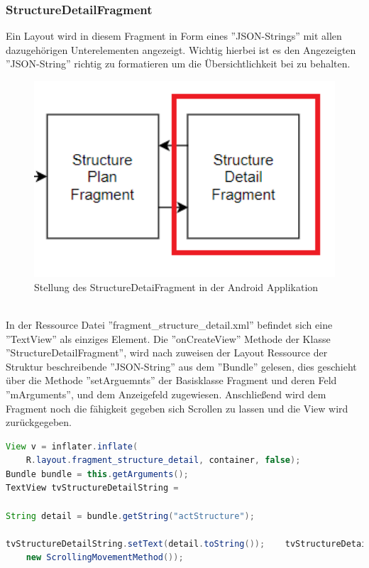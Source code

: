 \subsubsection{StructureDetailFragment}
Ein Layout wird in diesem Fragment in Form eines ''JSON-Strings'' mit allen dazugehörigen Unterelementen angezeigt. Wichtig hierbei ist es den Angezeigten ''JSON-String'' richtig zu formatieren um die Übersichtlichkeit bei zu behalten.
\\
\begin{figure}[H]
\centering
\includegraphics[width=1.0\textwidth]{images/06_AndroidApp/06_StructureDetailStellung}
\caption{Stellung des StructureDetaiFragment in der Android Applikation}
\label{fig:mediaNav}
\end{figure}
\\
In der Ressource Datei ''fragment\_structure\_detail.xml'' befindet sich eine ''TextView'' als einziges Element. Die ''onCreateView'' Methode der Klasse ''StructureDetailFragment'', wird nach zuweisen der Layout Ressource der Struktur beschreibende ''JSON-String'' aus dem ''Bundle'' gelesen, dies geschieht über die Methode ''setArguemnts'' der Basisklasse Fragment und deren Feld ''mArguments'', und dem Anzeigefeld zugewiesen. Anschließend wird dem Fragment noch die fähigkeit gegeben sich Scrollen zu lassen und die View wird zurückgegeben. 
\begin{lstlisting}[language=Java,caption={Übernahme und anzeigen der Daten im StructureDetailFragment}]
View v = inflater.inflate(
	R.layout.fragment_structure_detail, container, false);
Bundle bundle = this.getArguments();
TextView tvStructureDetailString = 													v.findViewById(R.id.tvStructureDetailString);
    
String detail = bundle.getString("actStructure");
    
tvStructureDetailString.setText(detail.toString());    tvStructureDetailString.setMovementMethod(
    new ScrollingMovementMethod());
\end{lstlisting}
